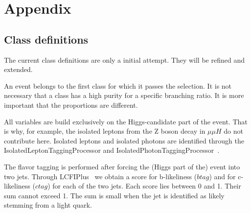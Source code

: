\documentclass[11pt, hidelinks, a4paper]{scrartcl}
\begin{document}
\begin{thebibliography}{10}
{  }
  \end{thebibliography}\endgroup %

  \newpage
  \appendix
  \section*{Appendix}
  \subsection*{Class definitions}
  The current class definitions are only a initial attempt.
  They will be refined and extended.

  An event belongs to the first class for which it passes the selection.
  It is not necessary that a class has a high purity for a specific branching ratio.
  It is more important that the proportions are different.

  All variables are build exclusively on the Higgs-candidate part of the event.
  That is why, for example, the isolated leptons
  from the Z boson decay in $\mu \mu H$ do not contribute here.
  Isolated leptons and isolated photons are identified through the
  IsolatedLeptonTaggingProcessor
  and IsolatedPhotonTaggingProcessor~\cite{ILCSoft}.

  The flavor tagging is performed after forcing the (Higgs part of the)
  event into two jets.
  Through LCFIPlus~\cite{LCFIPlus} we obtain a score for b-likeliness ($btag$)
  and for c-likeliness ($ctag$) for each of the two jets.
  Each score lies between 0 and 1.
  Their sum cannot exceed 1.
  The sum is small when the jet is identified as likely stemming from a light quark.
\end{document}
